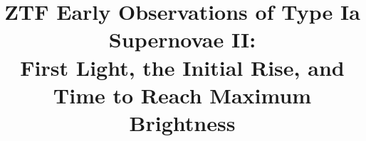 \documentclass[twocolumn]{./aastex63}
\begin{document}
\title{ZTF Early Observations of Type Ia  Supernovae II: \\ First Light, the Initial Rise, and Time to Reach Maximum Brightness}


\end{document}

